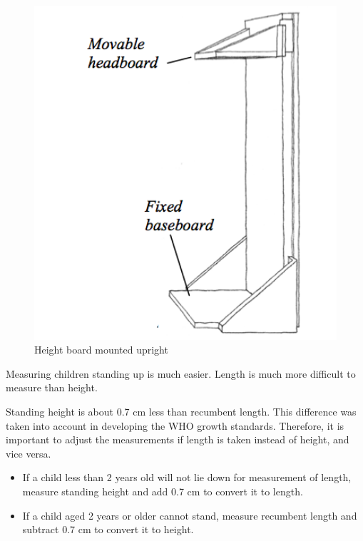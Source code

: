 \documentclass[12pt,]{book}
\theoremstyle{definition}
\theoremstyle{definition}
\theoremstyle{definition}
\theoremstyle{remark}
\begin{document}
\begin{figure}

{\centering \includegraphics[width=5.4in]{images/heightBoard04} 

}

\caption{Height board mounted upright}\label{fig:height05}
\end{figure}

Measuring children standing up is much easier. Length is much more
difficult to measure than height.

Standing height is about 0.7 cm less than recumbent length. This
difference was taken into account in developing the WHO growth
standards. Therefore, it is important to adjust the measurements if
length is taken instead of height, and vice versa.

\begin{itemize}
\item
  If a child less than 2 years old will not lie down for measurement of
  length, measure standing height and add 0.7 cm to convert it to
  length.
\item
  If a child aged 2 years or older cannot stand, measure recumbent
  length and subtract 0.7 cm to convert it to height.
\end{itemize}
\end{document}
